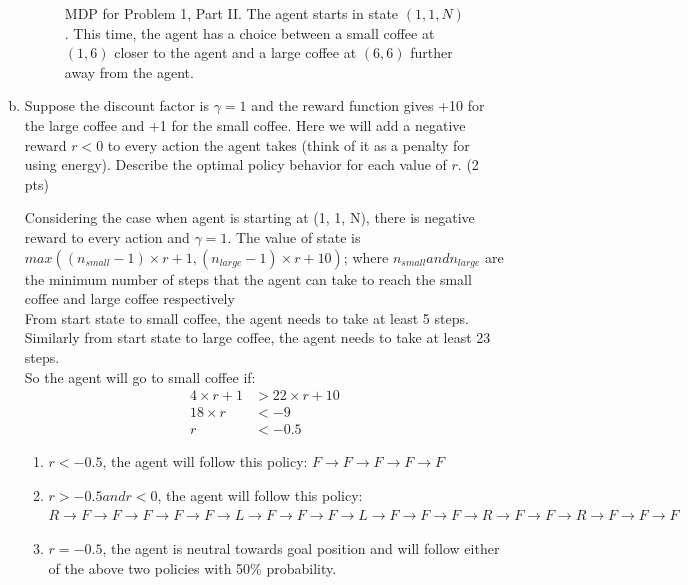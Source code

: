 \documentclass[12pt]{article}
\begin{document}
\begin{enumerate}[a)]
\begin{figure}[h]
  \caption{MDP for Problem 1, Part II. The agent starts in state $(1, 1, N)$. This time, the agent has a choice between a small coffee at $(1,6)$ closer to the agent and a large coffee at $(6,6)$ further away from the agent. \label{fig:1b-mdp}}
\end{figure}
\FloatBarrier

\item Suppose the discount factor is $\gamma = 1$ and the reward function gives +10 for the large coffee and +1 for the small coffee. Here we will add a negative reward $r < 0$ to every action the agent takes (think of it as a penalty for using energy). Describe the optimal policy behavior for each value of $r$. (2 pts)

\begin{solution}
Considering the case when agent is starting at (1, 1, N), there is negative reward to every action and $\gamma = 1$. The value of state is $ max((n_{small}-1) \times r + 1, (n_{large}-1) \times r + 10)$; where $n_{small} and n_{large}$ are the minimum number of steps that the agent can take to reach the small coffee and large coffee respectively\\
From start state to small coffee, the agent needs to take at least 5 steps. Similarly from start state to large coffee, the agent needs to take at least 23 steps.\\
So the agent will go to small coffee if:
\begin{align} 
4\times r + 1 &> 22 \times r + 10 \\
18\times r &< -9\\
r &< -0.5
\end{align}
\begin{enumerate}
\item $r < -0.5$, the agent will follow this policy: $F \rightarrow F \rightarrow F \rightarrow F \rightarrow F$
\item $r > -0.5 and r < 0$, the agent will follow this policy: $R \rightarrow F \rightarrow F \rightarrow F \rightarrow F \rightarrow F \rightarrow L \rightarrow F \rightarrow F \rightarrow F \rightarrow L \rightarrow F \rightarrow F \rightarrow F \rightarrow R \rightarrow F \rightarrow F \rightarrow R \rightarrow F \rightarrow F \rightarrow F$
\item  $r = -0.5$, the agent is neutral towards goal position and will follow either of the above two policies with 50\% probability.
\end{enumerate}
\end{solution}


\end{enumerate}
\end{document}
